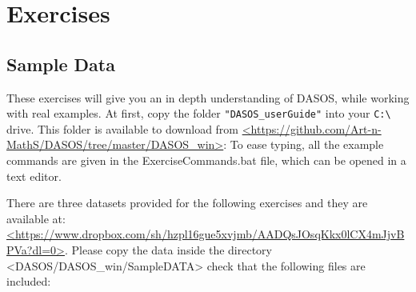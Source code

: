 \documentclass{article}
\begin{document}
			
	
	\newpage
	\section{Exercises}\label{exercises}
	
	   	\subsection{Sample Data}
	   	These exercises will give you an in depth understanding of DASOS, while working with real examples. At first, copy the folder \verb|"DASOS_userGuide"| into your \verb|C:\| drive. This folder is available to download from \url{<https://github.com/Art-n-MathS/DASOS/tree/master/DASOS_win>}: To ease typing, all the example commands are given in the ExerciseCommands.bat file, which can be opened in a text editor.
	   	
	   	There are three datasets provided for the following exercises and they are available at: \url{<https://www.dropbox.com/sh/hzpl16gue5xvjmb/AADQsJOsqKkx0lCX4mJjvBPVa?dl=0>}. Please copy the data inside the directory <DASOS/DASOS\_win/SampleDATA> check that the following files are included:
	   	
\end{document}
